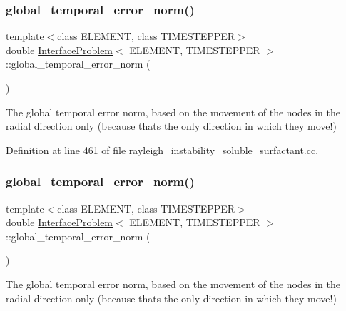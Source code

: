 \subsubsection{\texorpdfstring{global\+\_\+temporal\+\_\+error\+\_\+norm()}{global\_temporal\_error\_norm()}\hspace{0.1cm}{\footnotesize\ttfamily [1/2]}}
{\footnotesize\ttfamily template$<$class E\+L\+E\+M\+E\+NT, class T\+I\+M\+E\+S\+T\+E\+P\+P\+ER$>$ \\
double \hyperlink{classInterfaceProblem}{Interface\+Problem}$<$ E\+L\+E\+M\+E\+NT, T\+I\+M\+E\+S\+T\+E\+P\+P\+ER $>$\+::global\+\_\+temporal\+\_\+error\+\_\+norm (\begin{DoxyParamCaption}{ }\end{DoxyParamCaption})\hspace{0.3cm}{\ttfamily [inline]}}

The global temporal error norm, based on the movement of the nodes in the radial direction only (because that\textquotesingle{}s the only direction in which they move!) 

Definition at line 461 of file rayleigh\+\_\+instability\+\_\+soluble\+\_\+surfactant.\+cc.

\mbox{\label{classInterfaceProblem_a5eb5fa3bf4e7884984f285e24ba3ee7b}} 
\subsubsection{\texorpdfstring{global\+\_\+temporal\+\_\+error\+\_\+norm()}{global\_temporal\_error\_norm()}\hspace{0.1cm}{\footnotesize\ttfamily [2/2]}}
{\footnotesize\ttfamily template$<$class E\+L\+E\+M\+E\+NT, class T\+I\+M\+E\+S\+T\+E\+P\+P\+ER$>$ \\
double \hyperlink{classInterfaceProblem}{Interface\+Problem}$<$ E\+L\+E\+M\+E\+NT, T\+I\+M\+E\+S\+T\+E\+P\+P\+ER $>$\+::global\+\_\+temporal\+\_\+error\+\_\+norm (\begin{DoxyParamCaption}{ }\end{DoxyParamCaption})\hspace{0.3cm}{\ttfamily [inline]}}

The global temporal error norm, based on the movement of the nodes in the radial direction only (because that\textquotesingle{}s the only direction in which they move!) 

